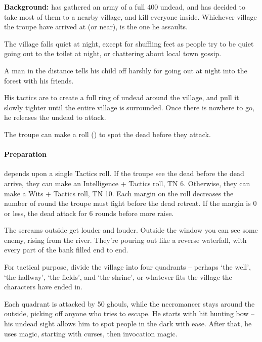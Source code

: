 \textbf{Background:}
 has gathered an army of a full 400 undead, and has decided to take most of them to a nearby village, and kill everyone inside.
Whichever \gls{village} the troupe have arrived at (or near), is the one he assaults.

\begin{boxtext}
  The village falls quiet at night, except for shuffling feet as people try to be quiet going out to the toilet at night, or chattering about local town gossip.

  A man in the distance tells his child off harshly for going out at night into the forest with his friends.
\end{boxtext}

His tactics are to create a full ring of undead around the village, and pull it slowly tighter until the entire village is surrounded.
Once there is nowhere to go, he releases the undead to attack.

The troupe can make a  roll (\tn[10]) to spot the dead before they attack.

\paragraph{Preparation} depends upon a single Tactics roll.
If the troupe see the dead before the dead arrive, they can make an Intelligence + Tactics roll, TN 6.
Otherwise, they can make a Wits + Tactics roll, TN 10.
Each margin on the roll decreases the number of round the troupe must fight before the dead retreat.
If the margin is 0 or less, the dead attack for 6 rounds before more raise.

\begin{boxtext}

  The screams outside get louder and louder.
  Outside the window you can see some enemy, rising from the river.
  They're pouring out like a reverse waterfall, with every part of the bank filled end to end.

\end{boxtext}

For tactical purpose, divide the village into four quadrants -- perhaps `the well', `the hallway', `the fields', and `the shrine', or whatever fits the village the characters have ended in.

Each quadrant is attacked by 50 ghouls, while the necromancer stays around the outside, picking off anyone who tries to escape.  He starts with hit hunting bow -- his undead sight allows him to spot people in the dark with ease.  After that, he uses magic, starting with curses, then invocation magic.

